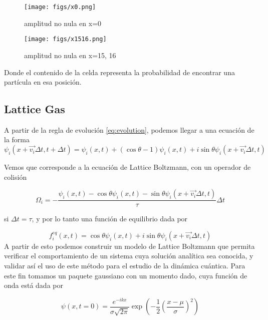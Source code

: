 \documentclass[12pts, letterpaper, twocolumn]{article}
\begin{document}
\begin{figure*}[h]
    \centering
    \texttt{[image: figs/x0.png]}
    \caption{amplitud no nula en x=0}
    \label{fig:x0}
\end{figure*}

\begin{figure*}[h]
    \centering
    \texttt{[image: figs/x1516.png]}
    \caption{amplitud no nula en x=15, 16}
    \label{fig:x15}
\end{figure*}

Donde el contenido de la celda representa la probabilidad de encontrar una partícula en 
esa posición. %

\subsection{Lattice Gas}
A partir de la regla de evolución \ref{eq:evolution}, podemos llegar a una ecuación de la 
forma 
\begin{equation}\label{eq:QLG}
    \psi_i(x+\vec{v_i}\Delta t, t +\Delta t) = \psi_i(x,t) + (\cos\theta -1)\psi_i(x,t)
    + i\sin\theta\psi_i(x+\vec{v_i}\Delta t,t)
\end{equation}

Vemos que corresponde a la ecuación de Lattice Boltzmann, con un operador de colisión 

\begin{equation*}
    \Omega_i = -\frac{\psi_i(x,t)-\cos\theta\psi_i(x,t)
    -\sin\theta\psi_i(x+\vec{v_i}\Delta t,t)}{\tau}\Delta t
\end{equation*}

si $\Delta t = \tau$, y por lo tanto una función de equilibrio dada por

\begin{equation*}
    f_i^{eq}(x,t)=\cos\theta\psi_i(x,t)+i\sin\theta\psi_i(x+\vec{v_i}\Delta t,t)
\end{equation*}
A partir de esto podemos construir un modelo de Lattice Boltzmann que permita verificar el
comportamiento de un sistema cuya solución analítica sea conocida, y validar así el uso de 
este método para el estudio de la dinámica cuántica. Para este fin tomamos un paquete 
gaussiano con un momento dado, cuya función de onda está dada por

\begin{equation*}
    \psi(x,t=0)=\frac{e^{-ikx}}{\sigma\sqrt{2\pi}}\exp{\left(-\frac{1}{2}\left(
        \frac{x-\mu}{\sigma}\right)^2\right)}
\end{equation*}
\end{document}
